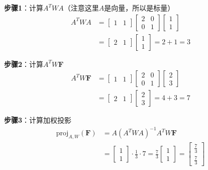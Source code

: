 \documentclass[12pt,a4paper]{article}
\begin{document}
\textbf{步骤1}：计算$A^T W A$（注意这里$A$是向量，所以是标量）
\begin{align}
A^T W A &= \begin{bmatrix} 1 & 1 \end{bmatrix} \begin{bmatrix} 2 & 0 \\ 0 & 1 \end{bmatrix} \begin{bmatrix} 1 \\ 1 \end{bmatrix} \\
&= \begin{bmatrix} 2 & 1 \end{bmatrix} \begin{bmatrix} 1 \\ 1 \end{bmatrix} = 2 + 1 = 3
\end{align}

\textbf{步骤2}：计算$A^T W \bm{F}$
\begin{align}
A^T W \bm{F} &= \begin{bmatrix} 1 & 1 \end{bmatrix} \begin{bmatrix} 2 & 0 \\ 0 & 1 \end{bmatrix} \begin{bmatrix} 2 \\ 3 \end{bmatrix} \\
&= \begin{bmatrix} 2 & 1 \end{bmatrix} \begin{bmatrix} 2 \\ 3 \end{bmatrix} = 4 + 3 = 7
\end{align}

\textbf{步骤3}：计算加权投影
\begin{align}
\text{proj}_{A,W}(\bm{F}) &= A (A^T W A)^{-1} A^T W \bm{F} \\
&= \begin{bmatrix} 1 \\ 1 \end{bmatrix} \cdot \frac{1}{3} \cdot 7 = \frac{7}{3} \begin{bmatrix} 1 \\ 1 \end{bmatrix} = \begin{bmatrix} \frac{7}{3} \\ \frac{7}{3} \end{bmatrix}
\end{align}
\end{document}
